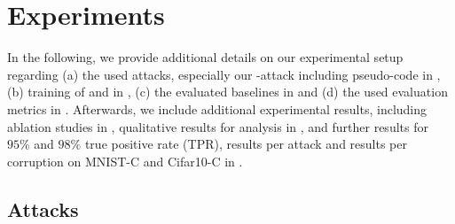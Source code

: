 \section{Experiments}
\label{sec:supp-experiments}

In the following, we provide additional details on our experimental setup regarding (a) the used attacks, especially our \PGD-\FConf attack including pseudo-code in , (b) training of \AdvTrain and \ConfTrain in , (c) the evaluated baselines in  and (d) the used evaluation metrics in . Afterwards, we include additional experimental results, including ablation studies in , qualitative results for analysis in , and further results for $95\%$ and $98\%$ true positive rate (TPR), results per attack and results per corruption on MNIST-C \citep{MuICMLWORK2019} and Cifar10-C \citep{HendrycksARXIV2019} in .

\subsection{Attacks}
\label{subsec:supp-experiments-attacks}

